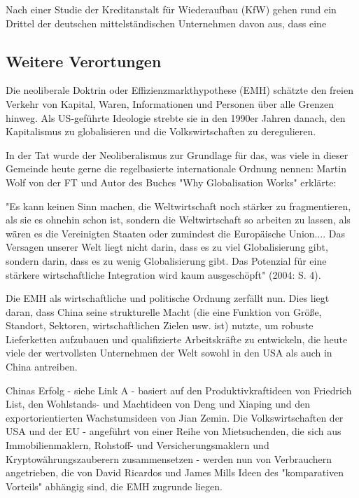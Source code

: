 \documentclass[12pt,a4paper,oneside]{book} %
\begin{document}
	
	
	
	Nach einer Studie der Kreditanstalt für Wiederaufbau (KfW) gehen rund ein Drittel der deutschen mittelständischen Unternehmen davon aus, dass eine 
	
	\subsection{Weitere Verortungen}
	
	
	Die neoliberale Doktrin oder Effizienzmarkthypothese (EMH) schätzte den freien Verkehr von Kapital, Waren, Informationen und Personen über alle Grenzen hinweg. Als US-geführte Ideologie strebte sie in den 1990er Jahren danach, den Kapitalismus zu globalisieren und die Volkswirtschaften zu deregulieren.
	
	In der Tat wurde der Neoliberalismus zur Grundlage für das, was viele in dieser Gemeinde heute gerne die regelbasierte internationale Ordnung nennen: Martin Wolf von der FT und Autor des Buches "Why Globalisation Works" erklärte:
	
	"Es kann keinen Sinn machen, die Weltwirtschaft noch stärker zu fragmentieren, als sie es ohnehin schon ist, sondern die Weltwirtschaft so arbeiten zu lassen, als wären es die Vereinigten Staaten oder zumindest die Europäische Union.... Das Versagen unserer Welt liegt nicht darin, dass es zu viel Globalisierung gibt, sondern darin, dass es zu wenig Globalisierung gibt. Das Potenzial für eine stärkere wirtschaftliche Integration wird kaum ausgeschöpft" (2004: S. 4).
	
	Die EMH als wirtschaftliche und politische Ordnung zerfällt nun. Dies liegt daran, dass China seine strukturelle Macht (die eine Funktion von Größe, Standort, Sektoren, wirtschaftlichen Zielen usw. ist) nutzte, um robuste Lieferketten aufzubauen und qualifizierte Arbeitskräfte zu entwickeln, die heute viele der wertvollsten Unternehmen der Welt sowohl in den USA als auch in China antreiben.
	
	Chinas Erfolg - siehe Link A - basiert auf den Produktivkraftideen von Friedrich List, den Wohlstands- und Machtideen von Deng und Xiaping und den exportorientierten Wachstumsideen von Jian Zemin. Die Volkswirtschaften der USA und der EU - angeführt von einer Reihe von Mietsuchenden, die sich aus Immobilienmaklern, Rohstoff- und Versicherungsmaklern und Kryptowährungszauberern zusammensetzen - werden nun von Verbrauchern angetrieben, die von David Ricardos und James Mills Ideen des "komparativen Vorteils" abhängig sind, die EMH zugrunde liegen.
	
\end{document}
